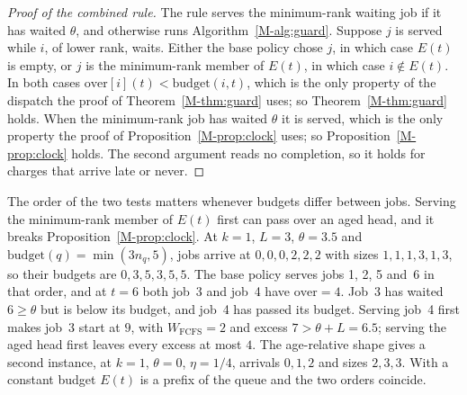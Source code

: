 \documentclass[mathematics,supfile,submit,moreauthors]{Definitions/mdpi}
\begin{document}
\begin{proof}[Proof of the combined rule]
The rule serves the minimum-rank waiting job if it has waited $\theta$, and otherwise
runs Algorithm~\ref*{M-alg:guard}. Suppose $j$ is served while $i$, of lower rank, waits. Either the
base policy chose $j$, in which case $E(t)$ is empty, or $j$ is the minimum-rank member
of $E(t)$, in which case $i \notin E(t)$. In both cases
$\mathrm{over}[i](t) < \mathrm{budget}(i,t)$, which is the only property of the
dispatch the proof of Theorem~\ref*{M-thm:guard} uses; so Theorem~\ref*{M-thm:guard} holds. When the minimum-rank job has
waited $\theta$ it is served, which is the only property the proof of Proposition~\ref*{M-prop:clock}
uses; so Proposition~\ref*{M-prop:clock} holds. The second argument reads no completion, so it holds for
charges that arrive late or never.
\end{proof}

The order of the two tests matters whenever budgets differ between jobs. Serving the
minimum-rank member of $E(t)$ first can pass over an aged head, and it breaks
Proposition~\ref*{M-prop:clock}. At $k = 1$, $L = 3$, $\theta = 3.5$ and
$\mathrm{budget}(q) = \min(3 n_q, 5)$, jobs arrive at $0, 0, 0, 2, 2, 2$ with sizes
$1, 1, 1, 3, 1, 3$, so their budgets are $0, 3, 5, 3, 5, 5$. The base policy serves
jobs 1, 2, 5 and~6 in that order, and at $t = 6$ both job~3 and job~4 have
$\mathrm{over} = 4$. Job~3 has waited $6 \ge \theta$ but is below its budget, and job~4
has passed its budget. Serving job~4 first makes job~3 start at $9$, with
$W_{\mathrm{FCFS}} = 2$ and excess $7 > \theta + L = 6.5$; serving the aged head first
leaves every excess at most $4$. The age-relative shape gives a second instance, at
$k = 1$, $\theta = 0$, $\eta = 1/4$, arrivals $0, 1, 2$ and sizes $2, 3, 3$. With a
constant budget $E(t)$ is a prefix of the queue and the two orders coincide.
\end{document}
